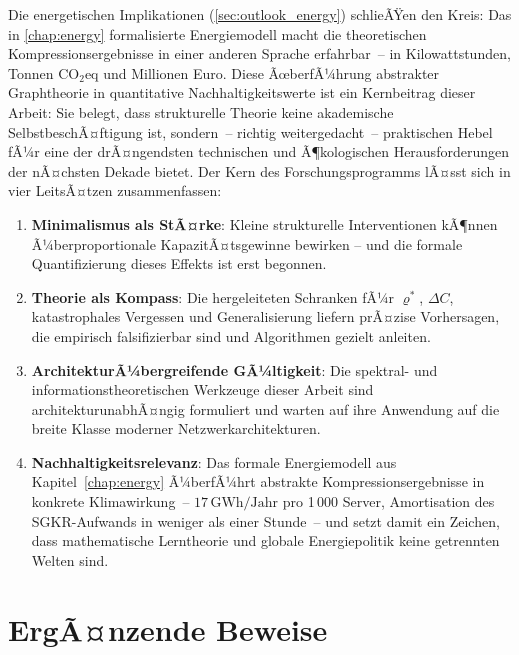 ﻿\documentclass[12pt, a4paper, openany]{report}
\begin{document}
Die energetischen Implikationen (\cref{sec:outlook_energy}) schlieÃŸen
den Kreis: Das in \cref{chap:energy} formalisierte Energiemodell macht
die theoretischen Kompressionsergebnisse in einer anderen Sprache erfahrbar~--
in Kilowattstunden, Tonnen CO$_2$eq und Millionen Euro.
Diese ÃœberfÃ¼hrung abstrakter Graphtheorie in quantitative
Nachhaltigkeitswerte ist ein Kernbeitrag dieser Arbeit: Sie belegt, dass
strukturelle Theorie keine akademische SelbstbeschÃ¤ftigung ist, sondern~--
richtig weitergedacht~-- praktischen Hebel fÃ¼r eine der drÃ¤ngendsten
technischen und Ã¶kologischen Herausforderungen der nÃ¤chsten Dekade bietet.
Der Kern des Forschungsprogramms lÃ¤sst sich in vier LeitsÃ¤tzen
zusammenfassen:
\begin{enumerate}[label=(\roman*)]
  \item \textbf{Minimalismus als StÃ¤rke}: Kleine strukturelle Interventionen
    kÃ¶nnen Ã¼berproportionale KapazitÃ¤tsgewinne bewirken -- und die formale
    Quantifizierung dieses Effekts ist erst begonnen.
  \item \textbf{Theorie als Kompass}: Die hergeleiteten Schranken fÃ¼r
    $\varrho^*$, $\Delta C$, katastrophales Vergessen und Generalisierung
    liefern prÃ¤zise Vorhersagen, die empirisch falsifizierbar sind und
    Algorithmen gezielt anleiten.
  \item \textbf{ArchitekturÃ¼bergreifende GÃ¼ltigkeit}: Die spektral-
    und informationstheoretischen Werkzeuge dieser Arbeit sind
    architekturunabhÃ¤ngig formuliert und warten auf ihre Anwendung auf
    die breite Klasse moderner Netzwerkarchitekturen.
  \item \textbf{Nachhaltigkeitsrelevanz}: Das formale Energiemodell aus
    Kapitel~\ref{chap:energy} Ã¼berfÃ¼hrt abstrakte Kompressionsergebnisse
    in konkrete Klimawirkung~-- $17\,\mathrm{GWh/Jahr}$ pro 1\,000 Server,
    Amortisation des SGKR-Aufwands in weniger als einer Stunde~-- und
    setzt damit ein Zeichen, dass mathematische Lerntheorie und globale
    Energiepolitik keine getrennten Welten sind.
\end{enumerate}

\appendix
\chapter{ErgÃ¤nzende Beweise}
\label{app:proofs}
\end{document}
